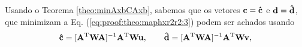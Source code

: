 \begin{myproofT}
Usando o Teorema \ref{theo:minAxbCAxb}, sabemos que os vetores $\VECTOR{c}=\VECTOR{\hat{c}}$ e $\VECTOR{d}=\VECTOR{\hat{d}}$,
que minimizam a Eq. (\ref{eq:proof:theo:maphxr2r2:3}) podem ser achados usando 
\begin{equation}\label{eq:proof:theo:maphxr2r2:5}
\VECTOR{\hat{c}}=[\MATRIX{A}^{\transpose}\MATRIX{W}\MATRIX{A}]^{-1}\MATRIX{A}^{\transpose}\MATRIX{W}\VECTOR{u},
\qquad
\VECTOR{\hat{d}}=[\MATRIX{A}^{\transpose}\MATRIX{W}\MATRIX{A}]^{-1}\MATRIX{A}^{\transpose}\MATRIX{W}\VECTOR{v},
\end{equation}
\end{myproofT}
